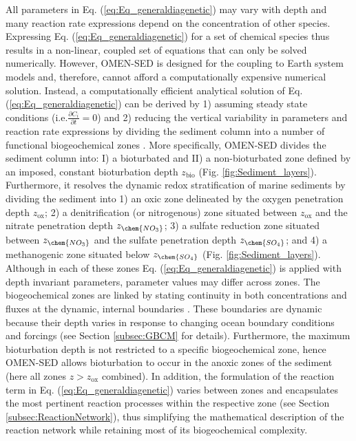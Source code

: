 \documentclass[gmd, manuscript]{copernicus}
\begin{document}
All parameters in Eq. (\ref{eq:Eq_generaldiagenetic}) may vary with depth and many reaction rate expressions depend on the concentration of other species. 
Expressing Eq. (\ref{eq:Eq_generaldiagenetic}) for a set of chemical species thus results in a non-linear, coupled set of equations that can only 
be solved numerically. 
However, OMEN-SED is designed for the coupling to Earth system models and, therefore, cannot afford a computationally expensive numerical solution. 
Instead, a computationally efficient analytical solution of Eq. (\ref{eq:Eq_generaldiagenetic}) can be derived by 1) assuming steady state conditions (i.e.$ \frac{\partial C_i}{\partial t}=0$) 
and 2) reducing the vertical variability in parameters and reaction rate expressions by dividing the sediment column into a number of functional 
biogeochemical zones \citep[Fig. \ref{fig:Sediment_layers}, compare e.g. ][for similar solutions]{billen1982idealized, goloway_diagenetic_1982, tromp_global_1995, gypens_simple_2008}. 
More specifically, OMEN-SED divides the sediment column into: I) a bioturbated and 
II) a non-bioturbated zone defined by an imposed, constant bioturbation depth $z_{\mathrm{bio}}$ (Fig. \ref{fig:Sediment_layers}). Furthermore, it resolves the dynamic redox stratification of marine sediments by dividing 
the sediment into 1) an oxic zone delineated by the oxygen penetration depth $z_{\mathrm{ox}}$; 2) a denitrification (or nitrogenous) zone situated between $z_{\mathrm{ox}}$ and the nitrate penetration depth $z_{\chem{NO_3}}$;
3) a sulfate reduction zone situated between $z_{\chem{NO_3}}$ and the sulfate penetration depth $z_{\chem{SO_4}}$; and 4) a methanogenic zone situated below $z_{\chem{SO_4}}$ (Fig. \ref{fig:Sediment_layers}).  
Although in each of these zones Eq. (\ref{eq:Eq_generaldiagenetic}) is applied with depth invariant parameters, parameter values may differ across zones. 
The biogeochemical zones are linked by stating continuity in both concentrations and fluxes at the dynamic, internal boundaries 
\citep[$z_b \in \{z_{\mathrm{bio}}, z_{\mathrm{ox}}, z_{\chem{NO_3}}, z_{\chem{SO_4}} \}$, compare e.g.][]{billen1982idealized, ruardij_benthic_1995}. These boundaries are dynamic because their depth varies in response to changing ocean 
boundary conditions and forcings (see Section \ref{subsec:GBCM} for details). Furthermore, the maximum bioturbation depth is not restricted to a specific biogeochemical zone, 
hence OMEN-SED allows bioturbation to occur in the anoxic zones of the sediment (here all zones $z > z_{\mathrm{ox}}$ combined). 
In addition, the formulation of the reaction term in Eq. (\ref{eq:Eq_generaldiagenetic}) varies between zones and encapsulates the most pertinent reaction 
processes within the respective zone (see Section \ref{subsec:ReactionNetwork}), thus simplifying the mathematical description of the reaction network while 
retaining most of its biogeochemical complexity.
\end{document}
